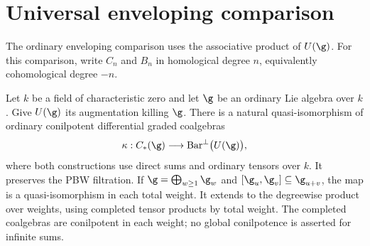 \section{Universal enveloping comparison}
The ordinary enveloping comparison uses the associative product of $U(\g)$.
For this comparison, write $C_n$ and $B_n$ in homological degree $n$,
equivalently cohomological degree $-n$.

\begin{theorem}
Let $k$ be a field of characteristic zero and let $\g$ be an ordinary Lie algebra over $k$.
Give $U(\g)$ its augmentation killing $\g$.
There is a natural quasi-isomorphism of ordinary conilpotent differential graded coalgebras
\[
 \kappa:C_*(\g)\longrightarrow\Barop^\perp\bigl(U(\g)\bigr),
\]
where both constructions use direct sums and ordinary tensors over $k$.
It preserves the PBW filtration.
If $\g=\bigoplus_{w\ge1}\g_w$ and $[\g_u,\g_v]\subseteq\g_{u+v}$,
the map is a quasi-isomorphism in each total weight.
It extends to the degreewise product over weights, using completed tensor products by total weight.
The completed coalgebras are conilpotent in each weight; no global conilpotence is asserted for infinite sums.
\end{theorem}
